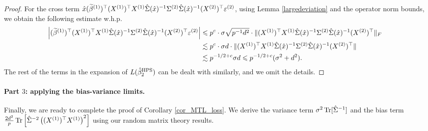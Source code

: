 \begin{proof}
For the cross term $\hat x (\widetilde \beta^{(1)})^\top (X^{(1)})^\top X^{(1)} \hat \Sigma(\hat x)^{-1}  \Sigma^{(2)} \hat \Sigma(\hat x)^{-1}  (X^{(2)})^\top  \varepsilon^{(2)}$, using Lemma \ref{largedeviation} and the operator norm bounds, we obtain the following estimate w.h.p.
\begin{align*}
 \left| (\widetilde \beta^{(1)})^\top (X^{(1)})^\top X^{(1)} \hat \Sigma(\hat x)^{-1}  \Sigma^{(2)} \hat \Sigma(\hat x)^{-1}  (X^{(2)})^\top  \varepsilon^{(2)}\right|  & \leqslant p^c \cdot \sigma\sqrt{p^{-1}d^2} \cdot \|(X^{(1)})^\top X^{(1)} \hat \Sigma(\hat x)^{-1}  \Sigma^{(2)} \hat \Sigma(\hat x)^{-1}  (X^{(2)})^\top  \|_F \\
&\lesssim p^{c}\cdot \sigma d \cdot  \|(X^{(1)})^\top X^{(1)} \hat \Sigma(\hat x)^{-1}  \Sigma^{(2)} \hat \Sigma(\hat x)^{-1}  (X^{(2)})^\top  \| \\
&\lesssim p^{-1/2+c}\sigma d\leqslant p^{-1/2+c}(\sigma^2+ d^2).
\end{align*}
The rest of the terms in the expansion of $L(\hat{\beta}_2^{\textup{HPS}})$ can be dealt with similarly, and we omit the details.
 \end{proof}
  
\paragraph{Part $3$: applying the bias-variance limits.}
Finally, we are ready to complete the proof of Corollary \ref{cor_MTL_loss}.
We derive the variance term $\sigma^2  \operatorname{Tr}[\hat\Sigma^{-1}]$ and the bias term $\frac{2d^2}{p} \operatorname{Tr}\left[\hat\Sigma^{-2} \left((X^{(1)})^\top X^{(1)} \right)^2\right]$ using our random matrix theory results.

